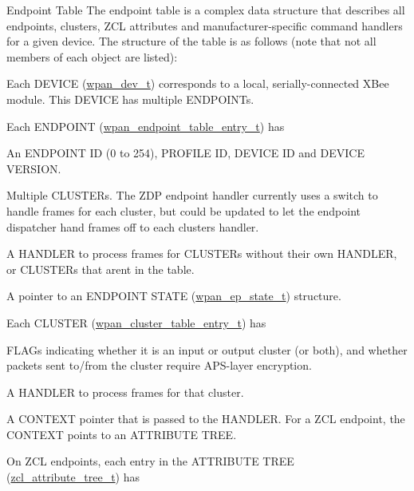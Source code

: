 \begin{DoxyParagraph}{Endpoint Table}
The endpoint table is a complex data structure that describes all endpoints, clusters, Z\+CL attributes and manufacturer-\/specific command handlers for a given device. The structure of the table is as follows (note that not all members of each object are listed)\+:
\begin{DoxyItemize}
\item Each D\+E\+V\+I\+CE (\hyperlink{structwpan__dev__t}{wpan\+\_\+dev\+\_\+t}) corresponds to a local, serially-\/connected X\+Bee module. This D\+E\+V\+I\+CE has multiple E\+N\+D\+P\+O\+I\+N\+Ts.
\item Each E\+N\+D\+P\+O\+I\+NT (\hyperlink{structwpan__endpoint__table__entry__t}{wpan\+\_\+endpoint\+\_\+table\+\_\+entry\+\_\+t}) has
\begin{DoxyItemize}
\item An E\+N\+D\+P\+O\+I\+NT ID (0 to 254), P\+R\+O\+F\+I\+LE ID, D\+E\+V\+I\+CE ID and D\+E\+V\+I\+CE V\+E\+R\+S\+I\+ON.
\item Multiple C\+L\+U\+S\+T\+E\+Rs. The Z\+DP endpoint handler currently uses a switch to handle frames for each cluster, but could be updated to let the endpoint dispatcher hand frames off to each cluster\textquotesingle{}s handler.
\item A H\+A\+N\+D\+L\+ER to process frames for C\+L\+U\+S\+T\+E\+Rs without their own H\+A\+N\+D\+L\+ER, or C\+L\+U\+S\+T\+E\+Rs that aren\textquotesingle{}t in the table.
\item A pointer to an E\+N\+D\+P\+O\+I\+NT S\+T\+A\+TE (\hyperlink{structwpan__ep__state__t}{wpan\+\_\+ep\+\_\+state\+\_\+t}) structure.
\end{DoxyItemize}
\item Each C\+L\+U\+S\+T\+ER (\hyperlink{structwpan__cluster__table__entry__t}{wpan\+\_\+cluster\+\_\+table\+\_\+entry\+\_\+t}) has
\begin{DoxyItemize}
\item F\+L\+A\+Gs indicating whether it is an input or output cluster (or both), and whether packets sent to/from the cluster require A\+P\+S-\/layer encryption.
\item A H\+A\+N\+D\+L\+ER to process frames for that cluster.
\item A C\+O\+N\+T\+E\+XT pointer that is passed to the H\+A\+N\+D\+L\+ER. For a Z\+CL endpoint, the C\+O\+N\+T\+E\+XT points to an A\+T\+T\+R\+I\+B\+U\+TE T\+R\+EE.
\end{DoxyItemize}
\item On Z\+CL endpoints, each entry in the A\+T\+T\+R\+I\+B\+U\+TE T\+R\+EE (\hyperlink{structzcl__attribute__tree__t}{zcl\+\_\+attribute\+\_\+tree\+\_\+t}) has

\end{DoxyItemize}
\end{DoxyParagraph}
